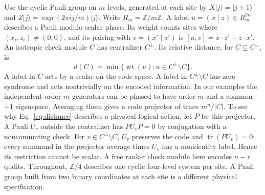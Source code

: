 \documentclass[11pt]{article}
\newcommand{\Z}{\mathbb Z}
\newcommand{\wt}{\operatorname{wt}}
\newcommand{\ket}[1]{\lvert #1\rangle}
\begin{document}
Use the cyclic Pauli group on $m$ levels, generated at each site by $X\ket{j}=\ket{j+1}$ and $Z\ket{j}=\exp(2\pi i j/m)\ket{j}$. Write $R_m=\Z/m\Z$. A label $u=(x\mid z)\in R_m^{2n}$ describes a Pauli modulo scalar phase. Its weight counts sites where $(x_i,z_i)\ne(0,0)$, and its pairing with $v=(x'\mid z')$ is $[u,v]=x\cdot z'-z\cdot x'$. An isotropic check module $C$ has centralizer $C^\perp$. Its relative distance, for $C\subsetneq C^\perp$, is
\begin{equation}\label{eq:distance}
 d(C)=\min\{\wt(u):u\in C^\perp\setminus C\}.
\end{equation}
A label in $C$ acts by a scalar on the code space. A label in $C^\perp\setminus C$ has zero syndrome and acts nontrivially on the encoded information. In our examples the independent order-$m$ generators can be phased to have order $m$ and a common $+1$ eigenspace. Averaging them gives a code projector of trace $m^n/|C|$. To see why Eq.~\eqref{eq:distance} describes a physical logical action, let $P$ be this projector. A Pauli $U_v$ outside the centralizer has $PU_vP=0$ by conjugation with a noncommuting check. For $v\in C^\perp\setminus C$, $U_v$ preserves the code and $\operatorname{tr}(PU_v)=0$: every summand in the projector average times $U_v$ has a nonidentity label. Hence its restriction cannot be scalar. A free rank-$r$ check module here encodes $n-r$ qudits. Throughout, $\Z/4$ describes one cyclic four-level system per site. A Pauli group built from two binary coordinates at each site is a different physical specification.
\end{document}
